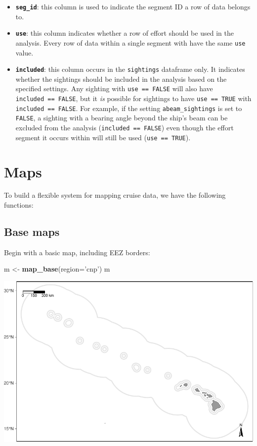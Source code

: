 \documentclass[
]{book}
\newenvironment{Shaded}{\begin{snugshade}}{\end{snugshade}}
\newcommand{\DataTypeTok}[1]{\textcolor[rgb]{0.13,0.29,0.53}{#1}}
\newcommand{\KeywordTok}[1]{\textcolor[rgb]{0.13,0.29,0.53}{\textbf{#1}}}
\newcommand{\NormalTok}[1]{#1}
\newcommand{\StringTok}[1]{\textcolor[rgb]{0.31,0.60,0.02}{#1}}
\begin{document}
\begin{itemize}
\item
  \textbf{\texttt{seg\_id}}: this column is used to indicate the segment ID a row of data belongs to.
\item
  \textbf{\texttt{use}}: this column indicates whether a row of effort should be used in the analysis. Every row of data within a single segment with have the same \texttt{use} value.
\item
  \textbf{\texttt{included}}: this column occurs in the \texttt{sightings} dataframe only. It indicates whether the sightings should be included in the analysis based on the specified settings. Any sighting with \texttt{use\ ==\ FALSE} will also have \texttt{included\ ==\ FALSE}, but it \emph{is} possible for sightings to have \texttt{use\ ==\ TRUE} with \texttt{included\ ==\ FALSE}. For example, if the setting \texttt{abeam\_sightings} is set to \texttt{FALSE}, a sighting with a bearing angle beyond the ship's beam can be excluded from the analysis (\texttt{included\ ==\ FALSE}) even though the effort segment it occurs within will still be used (\texttt{use\ ==\ TRUE}).
\end{itemize}

\hypertarget{maps}{%
\chapter{Maps}\label{maps}}

To build a flexible system for mapping cruise data, we have the following functions:

\hypertarget{base-maps}{%
\section*{Base maps}\label{base-maps}}

Begin with a basic map, including EEZ borders:

\begin{Shaded}
\begin{Highlighting}[]
\NormalTok{m <-}\StringTok{ }\KeywordTok{map_base}\NormalTok{(}\DataTypeTok{region=}\StringTok{'cnp'}\NormalTok{)}
\NormalTok{m}
\end{Highlighting}
\end{Shaded}

\includegraphics{figures/unnamed-chunk-54-1.pdf}
\end{document}
